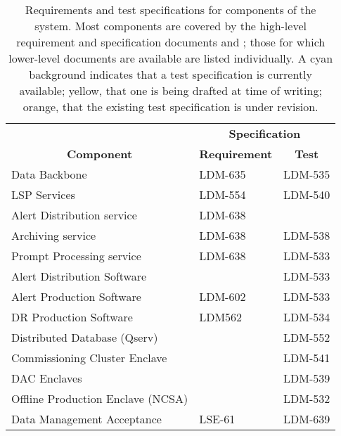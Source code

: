 \begin{longtable}{p{}p{}p{}}

\caption{Requirements and test specifications for components of the \product{} system.
Most components are covered by the high-level requirement and specification documents  and ; those for which lower-level documents are available are listed individually.
A cyan background indicates that a test specification is currently available; yellow, that one is being drafted at time of writing; orange, that the existing test specification is under revision.
\label{tab:testspecs}} \\

\toprule
                                       & \multicolumn{2}{c}{\textbf{Specification}} \\
\multicolumn{1}{c}{\textbf{Component}} & \multicolumn{1}{c}{\textbf{Requirement}} & \multicolumn{1}{c}{\textbf{Test}} \\
\toprule
Data Backbone                     & \cellcolor{dmorange} LDM-635 & \cellcolor{dmyellow} LDM-535 \\
LSP Services                      &   \cellcolor{dmblue} LDM-554 &   \cellcolor{dmblue} LDM-540 \\
Alert Distribution service        & \cellcolor{dmyellow} LDM-638 &                              \\
Archiving service                 & \cellcolor{dmyellow} LDM-638 &   \cellcolor{dmblue} LDM-538 \\
Prompt Processing service         & \cellcolor{dmyellow} LDM-638 &   \cellcolor{dmblue} LDM-533 \\
Alert Distribution Software       &                              &   \cellcolor{dmblue} LDM-533 \\
Alert Production Software         &   \cellcolor{dmblue} LDM-602 &   \cellcolor{dmblue} LDM-533 \\
DR Production Software            &    \cellcolor{dmblue} LDM562 &   \cellcolor{dmblue} LDM-534 \\
Distributed Database (Qserv)      &                              &   \cellcolor{dmblue} LDM-552 \\
Commissioning Cluster Enclave     &                              & \cellcolor{dmyellow} LDM-541 \\
DAC Enclaves                      &                              & \cellcolor{dmyellow} LDM-539 \\
Offline Production Enclave (NCSA) &                              & \cellcolor{dmyellow} LDM-532 \\
Data Management Acceptance        &    \cellcolor{dmblue} LSE-61 & \cellcolor{dmorange} LDM-639 \\
\bottomrule

\end{longtable}
